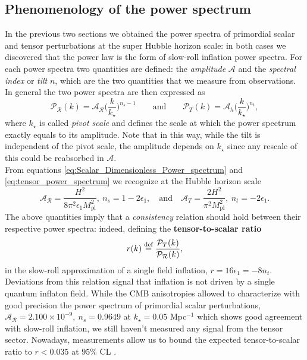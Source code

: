 \subsection{Phenomenology of the power spectrum}\label{sec:primordial_PS}
In the previous two sections we obtained the power spectra of primordial scalar and tensor perturbations at the super Hubble horizon scale: in both cases we discovered that the power law is the form of slow-roll inflation power spectra. For each power spectra two quantities are defined: the \emph{amplitude} $\mathcal A$ and the \emph{spectral index} or \emph{tilt} $n$, which are the two quantities that we measure from observations. In general the two power spectra are then expressed as
\begin{equation}
    \mathcal P_\mathcal{R}(k)=\mathcal{A_R}\bigg(\frac{k}{k_\star}\bigg)^{n_s-1}\qquad\text{and}\qquad\mathcal P_T(k)=\mathcal{A}_h\bigg(\frac{k}{k_\star}\bigg)^{n_t},
\end{equation}
where $k_\star$ is called \emph{pivot scale} and defines the scale at which the power spectrum exactly equals to its amplitude. Note that in this way, while the tilt is independent of the pivot scale, the amplitude depends on $k_\star$ since any rescale of this could be reabsorbed in $\mathcal A$.\\ From equations \eqref{eq:Scalar_Dimensionless_Power_spectrum} and \eqref{eq:tensor_power_spectrum} we recognize at the Hubble horizon scale
\begin{equation}
    \mathcal{A_R}=\frac{H^2}{8\pi^2\epsilon_1 M_\text{pl}^2 },\ n_s=1-2\epsilon_1,\quad\text{and}\quad\mathcal{A}_T=\frac{2H^2}{\pi^2M_\text{pl}^2},\ n_t=-2\epsilon_1.
\end{equation}
The above quantities imply that a \emph{consistency} relation should hold between their respective power spectra: indeed, defining the \textbf{tensor-to-scalar ratio}
\begin{equation}
    r(k)\stackrel{\text{def}}{=}\frac{\mathcal{P}_T(k)}{\mathcal{P_R}(k)},
\end{equation} 
in the slow-roll approximation of a single field inflation, $r=16\epsilon_1=-8n_t$. Deviations from this relation signal that inflation is not driven by a single quantum inflaton field. While the CMB anisotropies allowed to characterize with good precision the power spectrum of primordial scalar perturbations, $\mathcal{A_R}=2.100\times 10^{-9},\ n_s=0.9649$ at $k_\star=0.05$ Mpc$^{-1}$ \cite{planck2018results} which shows good agreement with slow-roll inflation, we still haven't measured any signal from the tensor sector. Nowadays, measurements allow us to bound the expected tensor-to-scalar ratio to $r<0.035$ at $95\%$ CL \cite{Ade_2021}.

